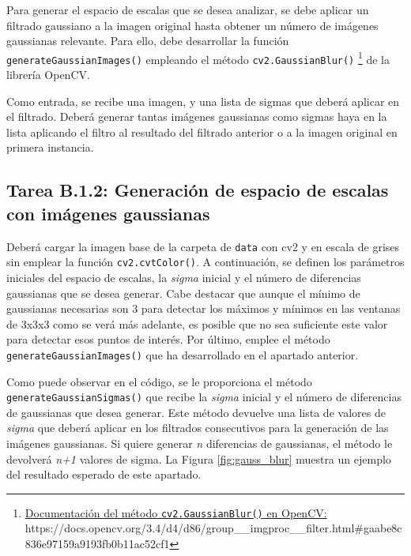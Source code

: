 Para generar el espacio de escalas que se desea analizar, se debe aplicar un filtrado gaussiano a la imagen original hasta obtener un número de imágenes gaussianas relevante. Para ello, debe desarrollar la función \texttt{generateGaussianImages()} empleando el método \texttt{cv2.GaussianBlur()} \footnote{ \href{https://docs.opencv.org/3.4/d4/d86/group\_\_imgproc\_\_filter.html\#gaabe8c836e97159a9193fb0b11ac52cf1}{Documentación del método \texttt{cv2.GaussianBlur()} en OpenCV:} \\{https://docs.opencv.org/3.4/d4/d86/group\_\_imgproc\_\_filter.html\#gaabe8c836e97159a9193fb0b11ac52cf1}} de la librería OpenCV.


Como entrada, se recibe una imagen, y una lista de sigmas que deberá aplicar en el filtrado. Deberá generar tantas imágenes gaussianas como sigmas haya en la lista aplicando el filtro al resultado del filtrado anterior o a la imagen original en primera instancia.

\subsection*{Tarea B.1.2: Generación de espacio de escalas con imágenes gaussianas}

Deberá cargar la imagen base de la carpeta de \texttt{data} con cv2 y en escala de grises sin emplear la función \texttt{cv2.cvtColor()}. A continuación, se definen los parámetros iniciales del espacio de escalas, la \textit{sigma} inicial y el número de diferencias gaussianas que se desea generar. Cabe destacar que aunque el mínimo de gaussianas necesarias son 3 para detectar los máximos y mínimos en las ventanas de 3x3x3 como se verá más adelante, es posible que no sea suficiente este valor para detectar esos puntos de interés. Por último, emplee el método \texttt{generateGaussianImages()} que ha desarrollado en el apartado anterior.

Como puede observar en el código, se le proporciona el método \texttt{generateGaussianSigmas()} que recibe la \textit{sigma} inicial y el número de diferencias de gaussianas que desea generar. Este método devuelve una lista de valores de \textit{sigma} que deberá aplicar en los filtrados consecutivos para la generación de las imágenes gaussianas. Si quiere generar \textit{n} diferencias de gaussianas, el método le devolverá \textit{n+1} valores de sigma. La Figura \ref{fig:gauss_blur} muestra un ejemplo del resultado esperado de este apartado.

